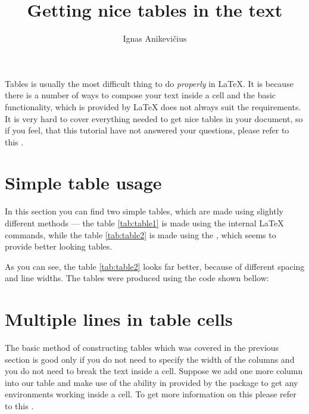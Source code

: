 \documentclass[
]{scrartcl}
\title{Getting nice tables in the text}
\author{Ignas Anikevičius}
\begin{document}

\maketitle
\tableofcontents
\listoftodos{\vskip 1em}

%
Tables is usually the most difficult thing to do \emph{properly} in \LaTeX{}. 
%
It is because there is a number of ways to compose your text inside a cell and
    the basic functionality, which is provided by \LaTeX{} does not always suit
    the requirements.
%
It is very hard to cover everything needed to get nice tables in your document,
    so if you feel, that this tutorial have not answered your questions, please
    refer to this
    .

\section{Simple table usage}

%
In this section you can find two simple tables, which are made using slightly
    different methods --- the table \ref{tab:table1} is made using the internal
    \LaTeX{} commands, while the table \ref{tab:table2} is made using the
    , which seems to provide better looking tables.

%



%
As you can see, the table \ref{tab:table2} looks far better, because of
    different spacing and line widths.
%
The tables were produced using the code shown bellow:
%



\section{Multiple lines in table cells}

%
The basic method of constructing tables which was covered in the previous
    section is good only if you do not need to specify the width of the columns
    and you do not need to break the text inside a cell.
%
Suppose we add one more column into our table and make use of the ability in
    provided by the  package to get any environments working inside a
    cell.
%
To get more information on this please refer to this
.
\end{document}
